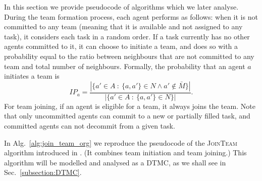 \documentclass{llncs}
\begin{document}
In this section we provide pseudocode of algorithms which we later analyse. During the team formation process, each agent performs as follows:
when it is not committed to any team (meaning that it is available and not assigned to any task), it considers each task in a random order. If a task currently
has no other agents committed to it, it can choose to initiate a team, and does so with a probability equal to the ratio between neighbours that are not committed to any team and total number of neighbours. Formally, the probability that an agent $a$ initiates a team is
\[
IP_a = \frac{|\{ a' \in A\ :\ \{a, a'\} \in N \wedge a' \notin \bar{M}  \}|}{|\{ a' \in A\ :\ \{a, a'\} \in N \}|}.
\label{eq:init_prob}
\]
For team joining, if an agent is eligible for a team, it always joins the team. Note that only uncommitted agents can commit to
a new or partially filled task, and committed agents can not decommit from a given task.
%



In Alg.~\ref{alg:join_team_org} we reproduce the pseudocode of the \textsc{JoinTeam} algorithm introduced in \cite{gaston2005agent}. (It combines team initiation and team joining.) %
This algorithm will be modelled and analysed as a DTMC, as we shall see in Sec.~\ref{subsection:DTMC}.
\end{document}
